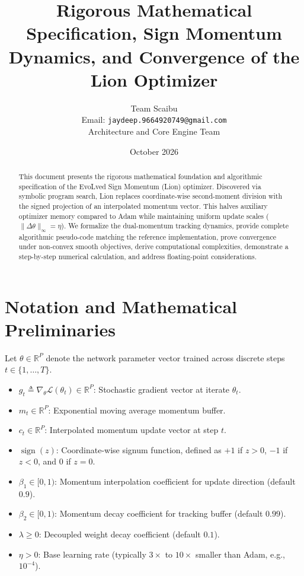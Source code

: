 \documentclass[11pt,a4paper]{article}
\title{\textbf{Rigorous Mathematical Specification, Sign Momentum Dynamics, and Convergence of the Lion Optimizer}}
\author{Team Scaibu \\ \small Email: \texttt{jaydeep.9664920749@gmail.com} \\ \small Architecture and Core Engine Team}
\date{October 2026}
\theoremstyle{definition}
\begin{document}
\maketitle

\begin{abstract}
This document presents the rigorous mathematical foundation and algorithmic specification of the EvoLved Sign Momentum (Lion) optimizer. Discovered via symbolic program search, Lion replaces coordinate-wise second-moment division with the signed projection of an interpolated momentum vector. This halves auxiliary optimizer memory compared to Adam while maintaining uniform update scales ($\|\Delta \theta\|_\infty = \eta$). We formalize the dual-momentum tracking dynamics, provide complete algorithmic pseudo-code matching the reference implementation, prove convergence under non-convex smooth objectives, derive computational complexities, demonstrate a step-by-step numerical calculation, and address floating-point considerations.
\end{abstract}

\section{Notation and Mathematical Preliminaries}

Let $\theta \in \mathbb{R}^P$ denote the network parameter vector trained across discrete steps $t \in \{1, \dots, T\}$.

\begin{itemize}
    \item $g_t \triangleq \nabla_\theta \mathcal{L}(\theta_t) \in \mathbb{R}^P$: Stochastic gradient vector at iterate $\theta_t$.
    \item $m_t \in \mathbb{R}^P$: Exponential moving average momentum buffer.
    \item $c_t \in \mathbb{R}^P$: Interpolated momentum update vector at step $t$.
    \item $\operatorname{sign}(z)$: Coordinate-wise signum function, defined as $+1$ if $z > 0$, $-1$ if $z < 0$, and $0$ if $z = 0$.
    \item $\beta_1 \in [0, 1)$: Momentum interpolation coefficient for update direction (default $0.9$).
    \item $\beta_2 \in [0, 1)$: Momentum decay coefficient for tracking buffer (default $0.99$).
    \item $\lambda \ge 0$: Decoupled weight decay coefficient (default $0.1$).
    \item $\eta > 0$: Base learning rate (typically $3\times$ to $10\times$ smaller than Adam, e.g., $10^{-4}$).
\end{itemize}
\end{document}
